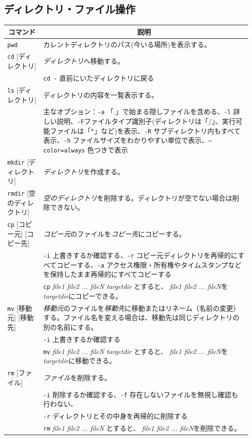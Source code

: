 \documentclass[a4j]{ltjreport}
\begin{document}
    \subsection{ディレクトリ・ファイル操作}
    \begin{longtable}[c]{|p{3.5cm}|p{13.5cm}|}
        \hline
        \multicolumn{1}{|c|}{\textbf{コマンド}}&\multicolumn{1}{|c|}{\textbf{説明}}\\
        \hline\hline

        \texttt{pwd}&カレントディレクトリのパス(今いる場所)を表示する。\\
        \hline 
        \texttt{cd} [ディレクトリ]&\emph{ディレクトリ}へ移動する。 \\
        &\texttt{cd -} 直前にいたディレクトリに戻る\\
        \hline
        \texttt{ls} [ディレクトリ]&ディレクトリの内容を一覧表示する。\\
        &主なオプション：\texttt{-a} 「.」で始まる隠しファイルを含める、\texttt{-l} 詳しい説明、\texttt{-F}ファイルタイプ識別子(ディレクトリは「/」、実行可能ファイルは「*」など)を表示、\texttt{-R} サブディレクトリ内もすべて表示、\texttt{-h} ファイルサイズをわかりやすい単位で表示、\texttt{--color=always} 色つきで表示 \\
        \hline

        \texttt{mkdir} [ディレクトリ]&\emph{ディレクトリ}を作成する。\\
        \hline
        \texttt{rmdir} {\small [空のディレクトリ]}&\emph{空のディレクトリ}を削除する。ディレクトリが空でない場合は削除できない。\\
        \hline

        \texttt{cp} [コピー元] [コピー先]&\emph{コピー元}のファイルを\emph{コピー先}にコピーする。\\
        &\texttt{-i} 上書きするか確認する、\texttt{-r} コピー元ディレクトリを再帰的にすべてコピーする、\texttt{-a} アクセス権限・所有権やタイムスタンプなどを保持したまま再帰的にすべてコピーする\\
        &\texttt{cp} \textit{file1 file2 ... fileN targetdir} とすると、\textit{ file1 file2 ... fileN}を\textit{ targetdir}にコピーできる。\\
        \hline
        \texttt{mv} [移動元] [移動先]&\emph{移動元}のファイルを\emph{移動先}に移動またはリネーム（名前の変更）する。ファイル名を変える場合は、移動先は同じディレクトリの別の名前にする。\\
        &\texttt{-i} 上書きするか確認する\\
        &\texttt{mv} \textit{file1 file2 ... fileN targetdir} とすると、\textit{ file1 file2 ... fileN}を\textit{ targetdir}に移動できる。\\
        \hline
        \texttt{rm} [ファイル]&\emph{ファイル}を削除する。\\
        &\texttt{-i} 削除するか確認する、\texttt{-f} 存在しないファイルを無視し確認も行わない、\\
        &\texttt{-r} ディレクトリとその中身を再帰的に削除する\\
        &\texttt{rm} \textit{file1 file2 ... fileN} とすると、\textit{ file1 file2 ... fileN}を削除できる。\\
        \hline


\end{longtable}
\end{document}
